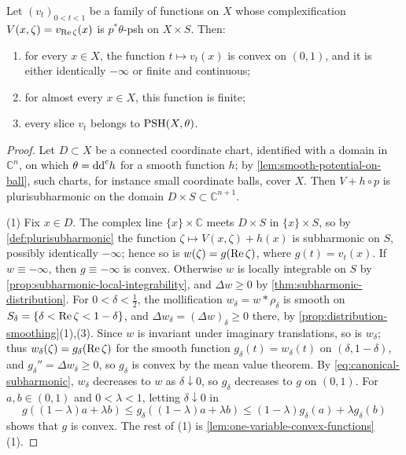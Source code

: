 \begin{lemma}\label{lem:invariant-fiber-convexity}
Let $(v_t)_{0<t<1}$ be a family of functions on $X$ whose complexification $V(x,\zeta)=v_{\operatorname{Re}\zeta}(x)$ is $p^*\theta$-psh on $X\times S$. Then:
\begin{enumerate}
 \item for every $x\in X$, the function $t\mapsto v_t(x)$ is convex on $(0,1)$, and it is either identically $-\infty$ or finite and continuous;
 \item for almost every $x\in X$, this function is finite;
 \item every slice $v_t$ belongs to $\mathrm{PSH}(X,\theta)$.
\end{enumerate}
\end{lemma}
\begin{proof}
Let $D\subset X$ be a connected coordinate chart, identified with a domain in $\mathbb C^n$, on which $\theta=\mathrm{dd}^{\mathrm{c}} h$ for a smooth function $h$; by \cref{lem:smooth-potential-on-ball}, such charts, for instance small coordinate balls, cover $X$. Then $V+h\circ p$ is plurisubharmonic on the domain $D\times S\subset\mathbb C^{n+1}$.

(1) Fix $x\in D$. The complex line $\{x\}\times\mathbb C$ meets $D\times S$ in $\{x\}\times S$, so by \cref{def:plurisubharmonic} the function $\zeta\mapsto V(x,\zeta)+h(x)$ is subharmonic on $S$, possibly identically $-\infty$; hence so is $w(\zeta)=g(\operatorname{Re}\zeta)$, where $g(t)=v_t(x)$. If $w\equiv-\infty$, then $g\equiv-\infty$ is convex. Otherwise $w$ is locally integrable on $S$ by \cref{prop:subharmonic-local-integrability}, and $\Delta w\geq0$ by \cref{thm:subharmonic-distribution}. For $0<\delta<\frac12$, the mollification $w_\delta=w*\rho_\delta$ is smooth on $S_\delta=\{\delta<\operatorname{Re}\zeta<1-\delta\}$, and $\Delta w_\delta=(\Delta w)_\delta\geq0$ there, by \cref{prop:distribution-smoothing}(1),(3). Since $w$ is invariant under imaginary translations, so is $w_\delta$; thus $w_\delta(\zeta)=g_\delta(\operatorname{Re}\zeta)$ for the smooth function $g_\delta(t)=w_\delta(t)$ on $(\delta,1-\delta)$, and $g_\delta''=\Delta w_\delta\geq0$, so $g_\delta$ is convex by the mean value theorem. By \eqref{eq:canonical-subharmonic}, $w_\delta$ decreases to $w$ as $\delta\downarrow0$, so $g_\delta$ decreases to $g$ on $(0,1)$. For $a,b\in(0,1)$ and $0<\lambda<1$, letting $\delta\downarrow0$ in
\[
 g((1-\lambda)a+\lambda b)\leq g_\delta((1-\lambda)a+\lambda b)\leq(1-\lambda)g_\delta(a)+\lambda g_\delta(b)
\]
shows that $g$ is convex. The rest of (1) is \cref{lem:one-variable-convex-functions}(1).


\end{proof}
